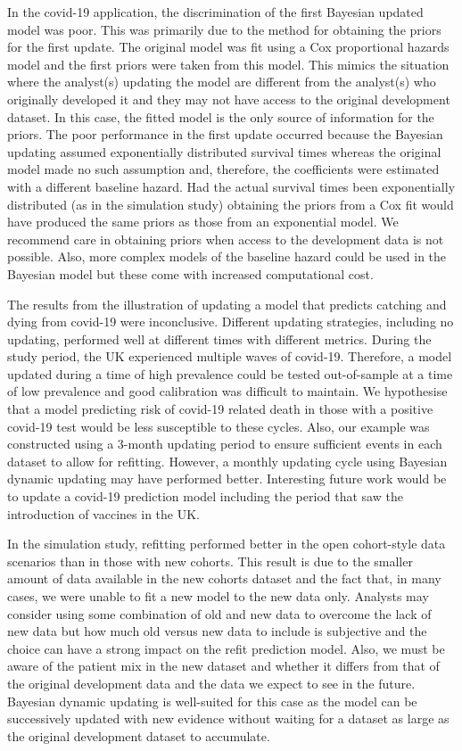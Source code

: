 \documentclass[]{article}
\begin{document}
In the covid-19 application, the discrimination of the first Bayesian updated model was poor. This was primarily due to the method for obtaining the priors for the first update. The original model was fit using a Cox proportional hazards model and the first priors were taken from this model. This mimics the situation where the analyst(s) updating the model are different from the analyst(s) who originally developed it and they may not have access to the original development dataset. In this case, the fitted model is the only source of information for the priors. The poor performance in the first update occurred because the Bayesian updating assumed exponentially distributed survival times whereas the original model made no such assumption and, therefore, the coefficients were estimated with a different baseline hazard. Had the actual survival times been exponentially distributed (as in the simulation study) obtaining the priors from a Cox fit would have produced the same priors as those from an exponential model. We recommend care in obtaining priors when access to the development data is not possible. Also, more complex models of the baseline hazard could be used in the Bayesian model but these come with increased computational cost.

The results from the illustration of updating a model that predicts catching and dying from covid-19 were inconclusive. Different updating strategies, including no updating, performed well at different times with different metrics. During the study period, the UK experienced multiple waves of covid-19. Therefore, a model updated during a time of high prevalence could be tested out-of-sample at a time of low prevalence and good calibration was difficult to maintain. We hypothesise that a model predicting risk of covid-19 related death in those with a positive covid-19 test would be less susceptible to these cycles. Also, our example was constructed using a 3-month updating period to ensure sufficient events in each dataset to allow for refitting. However, a monthly updating cycle using Bayesian dynamic updating may have performed better. Interesting future work would be to update a covid-19 prediction model including the period that saw the introduction of vaccines in the UK. 

 

In the simulation study, refitting performed better in the open cohort-style data scenarios than in those with new cohorts. This result is due to the smaller amount of data available in the new cohorts dataset and the fact that, in many cases, we were unable to fit a new model to the new data only. Analysts may consider using some combination of old and new data to overcome the lack of new data but how much old versus new data to include is subjective and the choice can have a strong impact on the refit prediction model. Also, we must be aware of the patient mix in the new dataset and whether it differs from that of the original development data and the data we expect to see in the future. Bayesian dynamic updating is well-suited for this case as the model can be successively updated with new evidence without waiting for a dataset as large as the original development dataset to accumulate.
\end{document}
